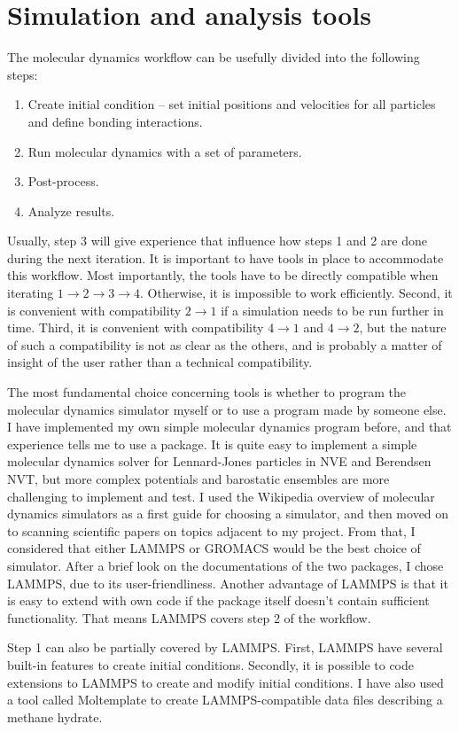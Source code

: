 \chapter{Simulation and analysis tools}
\label{ch:tools}
The molecular dynamics workflow can be usefully divided into the following steps: 
\begin{enumerate}
\item Create initial condition -- set initial positions and velocities for all particles and define bonding interactions.
\item Run molecular dynamics with a set of parameters.
\item Post-process.
\item Analyze results.
\end{enumerate}
Usually, step 3 will give experience that influence how steps 1 and 2 are done during the next iteration. It is important to have tools in place to accommodate this workflow. Most importantly, the tools have to be directly compatible when iterating $1 \to 2\to 3\to 4$. Otherwise, it is impossible to work efficiently. Second, it is convenient with compatibility $2\to 1$ if a simulation needs to be run further in time. Third, it is convenient with compatibility $4 \to 1$ and $4 \to 2$, but the nature of such a compatibility is not as clear as the others, and is probably a matter of insight of the user rather than a technical compatibility.

The most fundamental choice concerning tools is whether to program the molecular dynamics simulator myself or to use a program made by someone else. I have implemented my own simple molecular dynamics program before, and that experience tells me to use a package. It is quite easy to implement a simple molecular dynamics solver for Lennard-Jones particles in NVE and Berendsen NVT, but more complex potentials and barostatic ensembles are more challenging to implement and test. I used the Wikipedia overview of molecular dynamics simulators as a first guide for choosing a simulator, and then moved on to scanning scientific papers on topics adjacent to my project. From that, I considered that either LAMMPS or GROMACS would be the best choice of simulator. After a brief look on the documentations of the two packages, I chose LAMMPS, due to its user-friendliness. Another advantage of LAMMPS is that it is easy to extend with own code if the package itself doesn't contain sufficient functionality. That means LAMMPS covers step 2 of the workflow. 

Step 1 can also be partially covered by LAMMPS. First, LAMMPS have several built-in features to create initial conditions. Secondly, it is possible to code extensions to LAMMPS to create and modify initial conditions. I have also used a tool called Moltemplate to create LAMMPS-compatible data files describing a methane hydrate.

